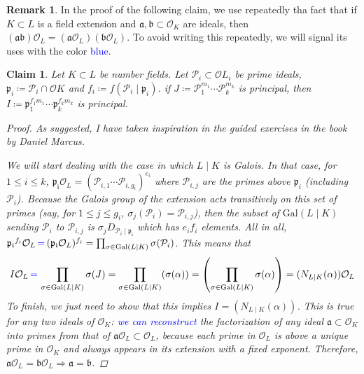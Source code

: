 \documentclass[11pt]{article}
\newtheorem{claim}[theorem]{Claim}
\theoremstyle{definition}
\newtheorem*{rk}{Remark}
\begin{document}
    \begin{rk}
        In the proof of the following claim, we use repeatedly tha fact that
        if $K \subset L$ is a field extension and $\mathfrak{a}, \mathfrak{b} \subset \mathcal{O}_K$ are ideals,
        then $(\mathfrak{a}\mathfrak{b})\mathcal{O}_L = (\mathfrak{a}\mathcal{O}_L) (\mathfrak{b}\mathcal{O}_L)$.
        To avoid writing this repeatedly, we will signal its uses with the color \textcolor{blue}{blue}.
    \end{rk}
    
    \begin{claim}
        Let $K \subset L$ be number fields.
        Let $\mathcal{P}_i \subset \mathcal{O}L_i$ be prime ideals,
        $\mathfrak{p}_i \coloneqq \mathcal{P}_i \cap \mathcal{O}K$ and
        $f_i \coloneqq f(\mathcal{P}_i \mid \mathfrak{p}_i)$.
        if $J \coloneqq \mathcal{P}_1^{m_1} \cdots \mathcal{P}_k^{m_k}$ is principal,
        then $I \coloneqq \mathfrak{p}_1^{f_1 m_1} \cdots \mathfrak{p}_k^{f_k m_k}$ is principal.

        \begin{proof}
            As suggested, I have taken inspiration in the guided exercises in the book by Daniel Marcus.\linebreak

            \noindent We will start dealing with the case in which $L\mid K$ is Galois.
            In that case, for $1 \leq i \leq k$,\linebreak
            $\mathfrak{p_i}\mathcal{O}_L = (\mathcal{P}_{i,1} \cdots \mathcal{P}_{i, g_i})^{e_i}$
            where $\mathcal{P}_{i,j}$ are the primes above $\mathfrak{p}_i$ (including $\mathcal{P}_i$).
            Because the Galois group of the extension acts transitively on this set of primes
            (say, for $1 \leq j \leq g_i$, $\sigma_j(\mathcal{P}_{i}) = \mathcal{P}_{i, j}$),
            then the subset of $\text{Gal}(L \mid K)$ sending $\mathcal{P}_{i}$ to $\mathcal{P}_{i, j}$
            is $\sigma_j D_{\mathcal{P}_i \mid \mathfrak{p_i}}$ which has $e_i f_i$ elements.
            All in all,
            $\mathfrak{p_i}^{f_i}\mathcal{O}_L \, \textcolor{blue}{=} \, (\mathfrak{p_i}\mathcal{O}_L)^{f_i} =
            \prod_{\sigma \in \text{Gal}(L \mid K)}\sigma(\mathcal{P}_i)$.
            This means that \[I\mathcal{O}_L \, \textcolor{blue}{=} \, \prod_{\sigma \in \text{Gal}(L \mid K)}\sigma(J) =
            \prod_{\sigma \in \text{Gal}(L \mid K)}(\sigma(\alpha)) = \left(\prod_{\sigma \in \text{Gal}(L \mid K)}\sigma(\alpha)\right)
            = (N_{L \mid K}(\alpha))\mathcal{O}_L\]
            To finish, we just need to show that this implies $I = (N_{L \mid K}(\alpha))$.
            This is true for any two ideals of $\mathcal{O}_K$:
            \textcolor{blue}{ we can reconstruct } the factorization of any ideal
            $\mathfrak{a} \subset \mathcal{O}_K$ into primes from
            that of $\mathfrak{a}\mathcal{O}_L \subset \mathcal{O}_L$,
            because each prime in $\mathcal{O}_L$ is above a unique prime in $\mathcal{O}_K$
            and always appears in its extension with a fixed exponent.
            Therefore, $\mathfrak{a}\mathcal{O}_L = \mathfrak{b}\mathcal{O}_L \Rightarrow \mathfrak{a} = \mathfrak{b}$.


\end{proof}
\end{claim}
\end{document}
